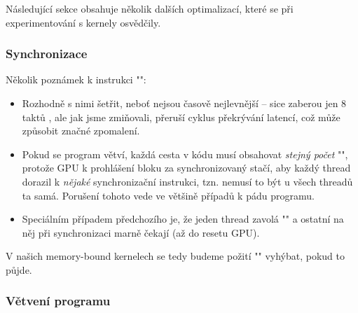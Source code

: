    Následující sekce obsahuje několik dalších optimalizací, které se při experimentování s kernely osvědčily. 

        \subsubsection{Synchronizace}

        Několik poznámek k instrukci \Vr"":
        \begin{itemize}
          \item Rozhodně s nimi šetřit, neboť nejsou časově nejlevnější -- sice zaberou jen 8 taktů \cite{CUDA programming g.}, ale jak jsme zmiňovali, přeruší cyklus překrývání latencí, což může způsobit značné zpomalení.
          \item Pokud se program větví, každá cesta v kódu musí obsahovat \emph{stejný počet} \Vr"", protože GPU k prohlášení bloku za synchronizovaný stačí, aby každý thread dorazil k \emph{nějaké} synchronizační instrukci, tzn. nemusí to být u všech threadů ta samá. Porušení tohoto vede ve většině případů k pádu programu.
          \item Speciálním případem předchozího je, že jeden thread zavolá \Vr"" a ostatní na něj při synchronizaci marně čekají (až do resetu GPU).
        \end{itemize}
        V našich memory-bound kernelech se tedy budeme požití \Vr"" vyhýbat, pokud to půjde.

        \subsubsection{Větvení programu}\label{větvení}

